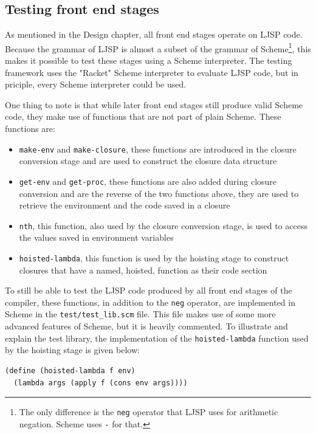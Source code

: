 \documentclass[11pt]{report}
\begin{document}
\subsection{Testing front end stages}
As mentioned in the Design chapter, all front end stages operate on LJSP code. Because the grammar of LJSP is almost a subset of the grammar of Scheme\footnote{The only difference is the \texttt{neg} operator that LJSP uses for arithmetic negation. Scheme uses \texttt{-} for that.}, this makes it possible to test these stages using a Scheme interpreter. The testing framework uses the "Racket" Scheme interpreter to evaluate LJSP code, but in priciple, every Scheme interpreter could be used.

One thing to note is that while later front end stages still produce valid Scheme code, they make use of functions that are not part of plain Scheme. These functions are:

\begin{itemize}
\item \texttt{make-env} and \texttt{make-closure}, these functions are introduced in the closure conversion stage and are used to construct the closure data structure
\item \texttt{get-env} and \texttt{get-proc}, these functions are also added during closure conversion and are the reverse of the two functions above, they are used to retrieve the environment and the code saved in a closure
\item \texttt{nth}, this function, also used by the closure conversion stage, is used to access the values saved in environment variables
\item \texttt{hoisted-lambda}, this function is used by the hoisting stage to construct closures that have a named, hoisted, function as their code section
\end{itemize}

To still be able to test the LJSP code produced by all front end stages of the compiler, these functions, in addition to the \texttt{neg} operator, are implemented in Scheme in the \texttt{test/test_lib.scm} file. This file makes use of some more advanced features of Scheme, but it is heavily commented. To illustrate and explain the test library, the implementation of the \texttt{hoisted-lambda} function used by the hoisting stage is given below:

\begin{lstlisting}
(define (hoisted-lambda f env) 
  (lambda args (apply f (cons env args))))
\end{lstlisting}
\end{document}
